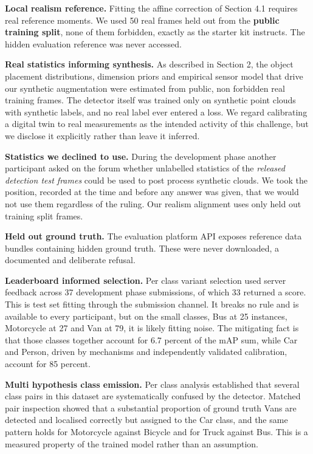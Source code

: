 \documentclass[
  10pt,
]{article}
\newcounter{none} %
\begin{document}
\textbf{Local realism reference.} Fitting the affine correction of
Section 4.1 requires real reference moments. We used 50 real frames held
out from the \textbf{public training split}, none of them forbidden,
exactly as the starter kit instructs. The hidden evaluation reference
was never accessed.

\textbf{Real statistics informing synthesis.} As described in Section 2,
the object placement distributions, dimension priors and empirical
sensor model that drive our synthetic augmentation were estimated from
public, non forbidden real training frames. The detector itself was
trained only on synthetic point clouds with synthetic labels, and no
real label ever entered a loss. We regard calibrating a digital twin to
real measurements as the intended activity of this challenge, but we
disclose it explicitly rather than leave it inferred.

\textbf{Statistics we declined to use.} During the development phase
another participant asked on the forum whether unlabelled statistics of
the \emph{released detection test frames} could be used to post process
synthetic clouds. We took the position, recorded at the time and before
any answer was given, that we would not use them regardless of the
ruling. Our realism alignment uses only held out training split frames.

\textbf{Held out ground truth.} The evaluation platform API exposes
reference data bundles containing hidden ground truth. These were never
downloaded, a documented and deliberate refusal.

\textbf{Leaderboard informed selection.} Per class variant selection
used server feedback across 37 development phase submissions, of which
33 returned a score. This is test set fitting through the submission
channel. It breaks no rule and is available to every participant, but on
the small classes, Bus at 25 instances, Motorcycle at 27 and Van at 79,
it is likely fitting noise. The mitigating fact is that those classes
together account for 6.7 percent of the mAP sum, while Car and Person,
driven by mechanisms and independently validated calibration, account
for 85 percent.

\textbf{Multi hypothesis class emission.} Per class analysis established
that several class pairs in this dataset are systematically confused by
the detector. Matched pair inspection showed that a substantial
proportion of ground truth Vans are detected and localised correctly but
assigned to the Car class, and the same pattern holds for Motorcycle
against Bicycle and for Truck against Bus. This is a measured property
of the trained model rather than an assumption.
\end{document}
